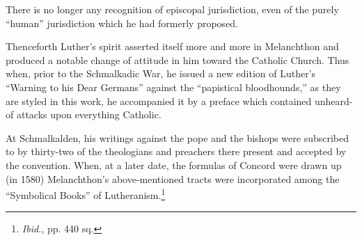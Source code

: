 There is no longer any recognition of episcopal jurisdiction, even of
the purely “human” jurisdiction which he had formerly proposed.

Thenceforth Luther’s spirit asserted itself more and more in Melanchthon
and produced a notable change of attitude in him toward
the Catholic Church. Thus when, prior to the Schmalkadic War, he
issued a new edition of Luther’s “Warning to his Dear Germans”
against the “papistical bloodhounds,” as they are styled in this work,
he accompanied it by a preface which contained unheard-of attacks
upon everything Catholic.

At Schmalkalden, his writings against the pope and the bishops
were subscribed to by thirty-two of the theologians and preachers
there present and accepted by the convention. When, at a later date,
the formulas of Concord were drawn up (in 1580) Melanchthon’s
above-mentioned tracts were incorporated among the “Symbolical
Books” of Lutheranism.\footnote{\textit{Ibid.}, pp. 440 sq.}
